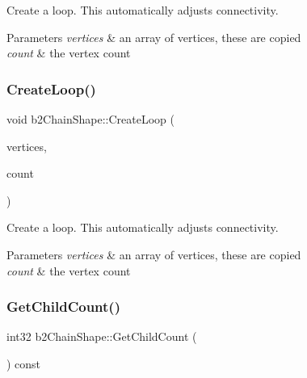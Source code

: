 Create a loop. This automatically adjusts connectivity. 
\begin{DoxyParams}{Parameters}
{\em vertices} & an array of vertices, these are copied \\
\hline
{\em count} & the vertex count \\
\hline
\end{DoxyParams}
\mbox{\label{classb2ChainShape_ac257742a52cac391e25962a4c703fb06}} 
\subsubsection{\texorpdfstring{Create\+Loop()}{CreateLoop()}\hspace{0.1cm}{\footnotesize\ttfamily [2/2]}}
{\footnotesize\ttfamily void b2\+Chain\+Shape\+::\+Create\+Loop (\begin{DoxyParamCaption}\item[{const \hyperlink{structb2Vec2}{b2\+Vec2} $\ast$}]{vertices,  }\item[{int32}]{count }\end{DoxyParamCaption})}

Create a loop. This automatically adjusts connectivity. 
\begin{DoxyParams}{Parameters}
{\em vertices} & an array of vertices, these are copied \\
\hline
{\em count} & the vertex count \\
\hline
\end{DoxyParams}
\mbox{\label{classb2ChainShape_a371b90f907f3b22e26db4d5d24560496}} 
\subsubsection{\texorpdfstring{Get\+Child\+Count()}{GetChildCount()}\hspace{0.1cm}{\footnotesize\ttfamily [1/2]}}
{\footnotesize\ttfamily int32 b2\+Chain\+Shape\+::\+Get\+Child\+Count (\begin{DoxyParamCaption}{ }\end{DoxyParamCaption}) const\hspace{0.3cm}{\ttfamily [virtual]}}

